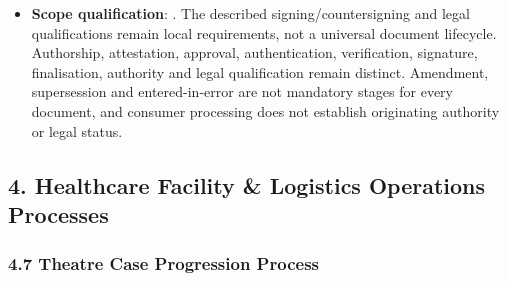 \begin{itemize}
\begin{itemize}
\end{itemize}


\item 
\textbf{Scope qualification}: \texttt{}. The described signing/\allowbreak{}countersigning and legal qualifications remain local requirements, not a universal document lifecycle. Authorship, attestation, approval, authentication, verification, signature, finalisation, authority and legal qualification remain distinct. Amendment, supersession and entered-in-error are not mandatory stages for every document, and consumer processing does not establish originating authority or legal status.



\end{itemize}
\label{rad:processes:166}

\par\smallskip
{}\label{rad:processes:168}
\subsection*{4. Healthcare Facility \& Logistics Operations Processes}
\label{rad:processes:170}
\subsubsection*{4.7 Theatre Case Progression Process}
\label{rad:processes:171}

